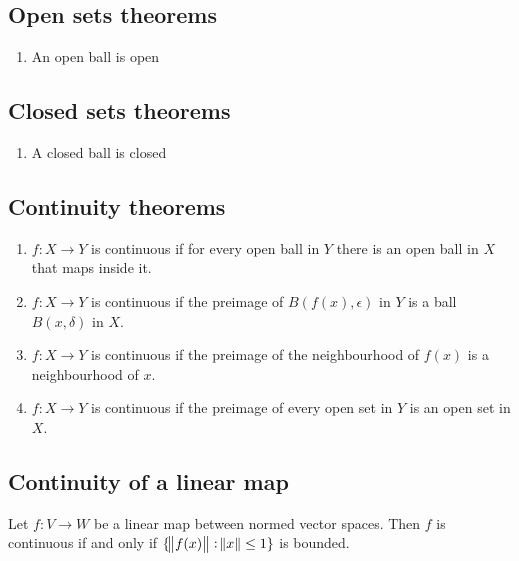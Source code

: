 \subsection{Open sets theorems}
\begin{enumerate}
\item An open ball is open
\end{enumerate}

\subsection{Closed sets theorems}
\begin{enumerate}
\item A closed ball is closed
\end{enumerate}


\subsection{Continuity theorems}
\begin{enumerate}
\item $f:X \to Y$ is continuous if for every open ball in $Y$ there is an open ball in $X$ that
  maps inside it.
\item $f:X \to Y$ is continuous if the preimage of $B(f(x), \epsilon)$ in $Y$ is a ball
  $B(x, \delta)$ in $X$.
\item $f:X \to Y$ is continuous if the preimage of the neighbourhood of $f(x)$ is a neighbourhood
  of $x$.
\item $f:X \to Y$ is continuous if the preimage of every open set in $Y$ is an open set in $X$.
\end{enumerate}


\subsection{Continuity of a linear map}
\begin{theorem}
  Let $f:V \to W$ be a linear map between normed vector spaces. Then $f$ is continuous if and only
  if $\{\norm{f(x)} : \norm{x} \leq 1\}$ is bounded.
\end{theorem}

